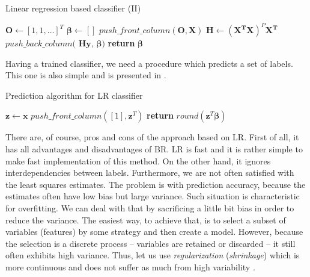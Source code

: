 \documentclass[english,a4paper,twoside]{ppfcmthesis}
\begin{document}
\begin{algorithm}
    \caption{Linear regression based classifier (II)}\label{alg:LR1}
    \begin{algorithmic}[1]
        \State $\boldsymbol{O} \gets [1, 1, \ldots]^T$ 
        \State $\boldsymbol{\beta} \gets []$
        \State $push\_front\_column(\boldsymbol{O}, \boldsymbol{X})$
        \State $\boldsymbol{H} \gets (\boldsymbol{X^T}\boldsymbol{X})^P\boldsymbol{X^T}$
            \State $push\_back\_column($ $\boldsymbol{H}\boldsymbol{y}$, $\boldsymbol{\beta})$ 
        \EndFor
        \State \textbf{return} $\boldsymbol{\beta}$
    \EndFunction
    \end{algorithmic}
\end{algorithm}


Having a trained classifier, we need a procedure which predicts a set of labels. This one is also simple and is presented in .

\begin{algorithm}
    \caption{Prediction algorithm for LR classifier}\label{alg:CL1}
    \begin{algorithmic}[1]
        \State $\boldsymbol{z} \gets \boldsymbol{x}$ 
        \State $push\_front\_column([1], \boldsymbol{z}^T)$ 
        \State \textbf{return} $round(\boldsymbol{z}^T\boldsymbol{\beta})$
    \EndFunction
    \end{algorithmic}
\end{algorithm}

There are, of course, pros and cons of the approach based on LR. First of all, it has all advantages and disadvantages of BR. LR is fast and it is rather simple to make fast implementation of this method. On the other hand, it ignores interdependencies between labels. Furthermore, we are not often satisfied with the least squares estimates. The problem is with prediction accuracy, because the estimates often have low bias but large variance. Such situation is characteristic for overfitting. We can deal with that by sacrificing a little bit bias in order to reduce the variance. The easiest way, to achieve that, is to select a subset of variables (features) by some strategy and then create a model. However, because the selection is a discrete process -- variables are retained or discarded -- it still often exhibits high variance. Thus, let us use \textit{regularization} (\textit{shrinkage}) which is more continuous and does not suffer as much from high variability \citep{Trevor}.
\end{document}
